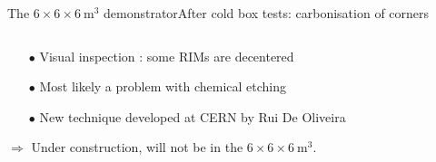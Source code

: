 \documentclass[10pt]{beamer}
\begin{document}
\begin{frame}{The \texorpdfstring{$6 \times 6 \times \SI{6}{\meter\cubed}$}{666} demonstrator}{After cold box tests: carbonisation of corners}
\begin{scriptsize}
\begin{columns}
\begin{column}{0.6\textwidth}
	       				\vfill
	       				\begin{itemize}
	       					\item[$\bullet$] Visual inspection : some RIMs are decentered
	       					\item[$\bullet$] Most likely a problem with chemical etching
	       					\item[$\bullet$] New technique developed at CERN by Rui De Oliveira
	       				\end{itemize}
	       				$\Rightarrow$ Under construction, will not be in the $6 \times 6 \times \SI{6}{\meter\cubed}$.
	       			\end{column}
	       		\end{columns}
	       	\end{scriptsize}
       \end{frame}
       {
       	\setlength\pdfpagewidth{12.8cm}%
       	\setlength\pdfpageheight{11.8cm}%
       \begin{frame}[plain]
       	
       \end{frame}
	    }
	    
\end{document}
